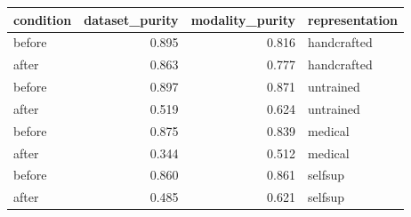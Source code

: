 \begin{tabular}{lrrl}
\toprule
condition & dataset\_purity & modality\_purity & representation \\
\midrule
before & 0.895 & 0.816 & handcrafted \\
after & 0.863 & 0.777 & handcrafted \\
before & 0.897 & 0.871 & untrained \\
after & 0.519 & 0.624 & untrained \\
before & 0.875 & 0.839 & medical \\
after & 0.344 & 0.512 & medical \\
before & 0.860 & 0.861 & selfsup \\
after & 0.485 & 0.621 & selfsup \\
\bottomrule
\end{tabular}
